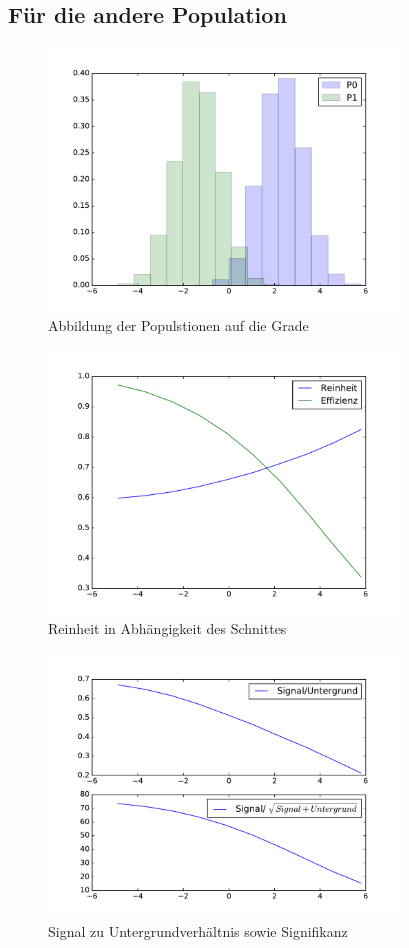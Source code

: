\subsection*{Für die andere Population}

\begin{figure}[H]
  \centering
  \includegraphics[height=7cm]{./Figures/secondHist.pdf}
  \caption{Abbildung der Populstionen auf die Grade}
\end{figure}

\begin{figure}[H]
  \centering
  \includegraphics[height=7cm]{./Figures/reinheit2.pdf}
  \caption{Reinheit in Abhängigkeit des Schnittes}
\end{figure}

\begin{figure}[H]
  \centering
  \includegraphics[height=7cm]{./Figures/SigZuUnt2.pdf}
  \caption{Signal zu Untergrundverhältnis sowie Signifikanz}
\end{figure}
